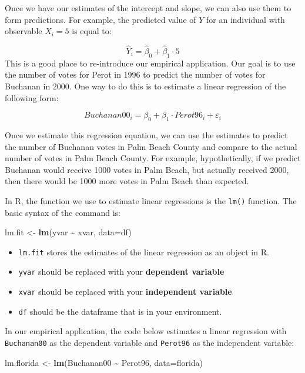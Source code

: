 \documentclass[
]{book}
\newenvironment{Shaded}{\begin{snugshade}}{\end{snugshade}}
\newcommand{\AttributeTok}[1]{\textcolor[rgb]{0.13,0.29,0.53}{#1}}
\newcommand{\FunctionTok}[1]{\textcolor[rgb]{0.13,0.29,0.53}{\textbf{#1}}}
\newcommand{\NormalTok}[1]{#1}
\newcommand{\OtherTok}[1]{\textcolor[rgb]{0.56,0.35,0.01}{#1}}
\newcommand{\SpecialCharTok}[1]{\textcolor[rgb]{0.81,0.36,0.00}{\textbf{#1}}}
\begin{document}
Once we have our estimates of the intercept and slope, we can also use them to form predictions. For example, the predicted value of \(Y\) for an individual with observable \(X_i=5\) is equal to:

\[
\hat{Y}_i = \hat{\beta}_0 + \hat{\beta}_1 \cdot 5 
\]
This is a good place to re-introduce our empirical application. Our goal is to use the number of votes for Perot in 1996 to predict the number of votes for Buchanan in 2000. One way to do this is to estimate a linear regression of the following form:

\[
Buchanan00_i = \beta_0 + \beta_1 \cdot Perot96_i + \varepsilon_i
\]

Once we estimate this regression equation, we can use the estimates to predict the number of Buchanan votes in Palm Beach County and compare to the actual number of votes in Palm Beach County. For example, hypothetically, if we predict Buchanan would receive 1000 votes in Palm Beach, but actually received 2000, then there would be 1000 more votes in Palm Beach than expected.

In R, the function we use to estimate linear regressions is the \texttt{lm()} function. The basic syntax of the command is:

\begin{Shaded}
\begin{Highlighting}[]
\NormalTok{lm.fit }\OtherTok{\textless{}{-}} \FunctionTok{lm}\NormalTok{(yvar }\SpecialCharTok{\textasciitilde{}}\NormalTok{ xvar, }\AttributeTok{data=}\NormalTok{df)}
\end{Highlighting}
\end{Shaded}

\begin{itemize}
\item
  \texttt{lm.fit} stores the estimates of the linear regression as an object in R.
\item
  \texttt{yvar} should be replaced with your \textbf{dependent variable}
\item
  \texttt{xvar} should be replaced with your \textbf{independent variable}
\item
  \texttt{df} should be the dataframe that is in your environment.
\end{itemize}

In our empirical application, the code below estimates a linear regression with \texttt{Buchanan00} as the dependent variable and \texttt{Perot96} as the independent variable:

\begin{Shaded}
\begin{Highlighting}[]
\NormalTok{lm.florida }\OtherTok{\textless{}{-}} \FunctionTok{lm}\NormalTok{(Buchanan00 }\SpecialCharTok{\textasciitilde{}}\NormalTok{ Perot96, }\AttributeTok{data=}\NormalTok{florida)}
\end{Highlighting}
\end{Shaded}
\end{document}
